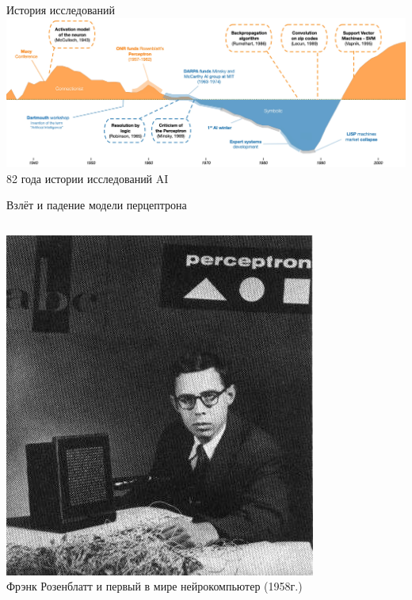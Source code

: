 \documentclass[aspectratio=169, professionalfonts]{beamer}
\begin{document}
\begin{frame}{История исследований}
    \centering
    \includegraphics[width=\linewidth]{figures/fig44-research-history.jpg} \\
    82 года истории исследований AI
\end{frame}

\begin{frame}{Взлёт и падение модели перцептрона}
    \begin{columns}
        \begin{column}{.49\linewidth}
            \centering
            \includegraphics[width=.7\linewidth]{figures/fig45-rosenblatt.jpg} \\
            Фрэнк Розенблатт и первый в мире нейрокомпьютер (1958г.)
        \end{column}
        \pause
        \begin{column}{.49\linewidth}
            \centering

\end{column}
\end{columns}
\end{frame}
\end{document}
